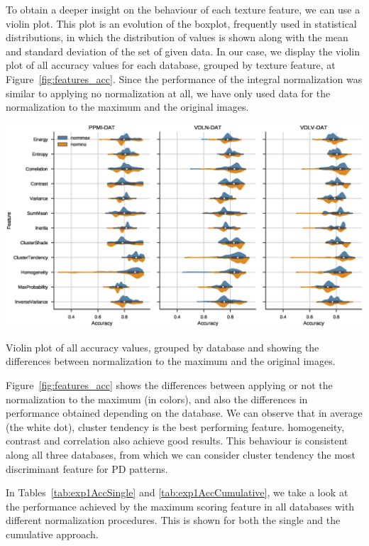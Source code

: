 To obtain a deeper insight on the behaviour of each texture feature, we can use a violin plot. This plot is an evolution of the boxplot, frequently used in statistical distributions, in which the distribution of values is shown along with the mean and standard deviation of the set of given data. In our case, we display the violin plot of all accuracy values for each database, grouped by texture feature, at Figure~\ref{fig:features_acc}. Since the performance of the integral normalization was similar to applying no normalization at all, we have only used data for the normalization to the maximum and the original images. 

\begin{bigfigure}
	\includegraphics[width=\textheight]{Graphics/ch5/features_acc.eps}\label{fig:acc_distances}
	\caption[Violin plot of all accuracy values, grouped by database.]{Violin plot of all accuracy values, grouped by database and showing the differences between normalization to the maximum and the original images.}
	\label{fig:features_acc}
\end{bigfigure}

Figure~\ref{fig:features_acc} shows the differences between applying or not the normalization to the maximum (in colors), and also the differences in performance obtained depending on the database. We can observe that in average (the white dot), cluster tendency is the best performing feature. homogeneity, contrast and correlation also achieve good results. This behaviour is consistent along all three databases, from which we can consider cluster tendency the most discriminant feature for \ac{PD} patterns. 

In Tables~\ref{tab:exp1AccSingle} and \ref{tab:exp1AccCumulative}, we take a look at the performance achieved by the maximum scoring feature in all databases with different normalization procedures. This is shown for both the single and the cumulative approach. 

